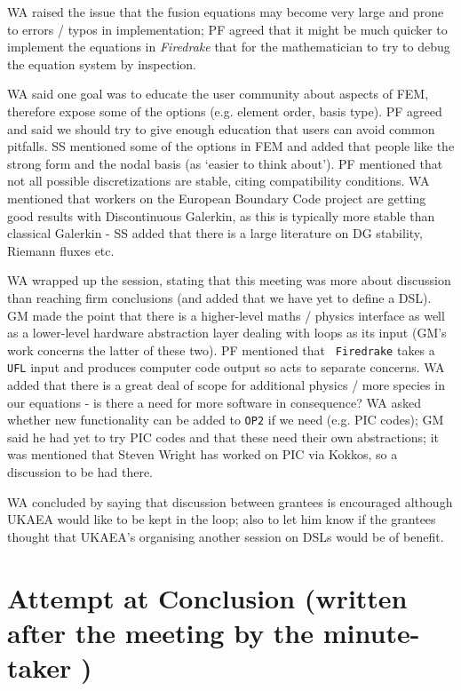 \documentclass[11pt]{article}
\begin{document}
WA raised the issue that the fusion equations may become very large and prone to 
errors / typos in implementation; PF agreed that it might be much quicker to 
implement the equations in {\it Firedrake} that for the mathematician to try to 
debug the equation system by inspection.

WA said one goal was to educate the user community about aspects of FEM, 
therefore expose some of the options (e.g. element order, basis type).  PF 
agreed and said we should try to give enough education that users can avoid 
common pitfalls. SS mentioned some of the options in FEM and added that people 
like the strong form and the nodal basis (as `easier to think about').  PF 
mentioned that not all possible discretizations are stable, citing 
compatibility conditions.  WA mentioned that workers on the European 
Boundary Code project are getting good results with Discontinuous
Galerkin, as this is typically more stable than classical Galerkin - SS 
added that there is a large literature on DG stability, Riemann fluxes etc.

WA wrapped up the session, stating that this meeting was more about discussion 
than reaching firm conclusions (and added that we have yet to define a DSL).  
GM made the point that there is a higher-level maths / physics interface as 
well as a lower-level hardware abstraction layer dealing with loops as its 
input (GM's work concerns the latter of these two).  PF mentioned that {\tt 
Firedrake} takes a {\tt UFL} input and produces computer code output so acts to 
separate concerns.  WA added that there is a great deal of scope for additional 
physics / more species in our equations - is there a need for more software
in consequence?
WA asked whether new functionality can be added to {\tt OP2} if we need (e.g. 
PIC codes); GM said he had yet to try PIC codes and that these need their own 
abstractions; it was mentioned that Steven Wright has worked on PIC via Kokkos, 
so a discussion to be had there.

WA concluded by saying that discussion between grantees is encouraged although UKAEA 
would like to be kept in the loop; also to let him know if the grantees 
thought that UKAEA's organising another session on DSLs would be of benefit.

\section{Attempt at Conclusion (written after the meeting by the minute-taker )}
\end{document}
